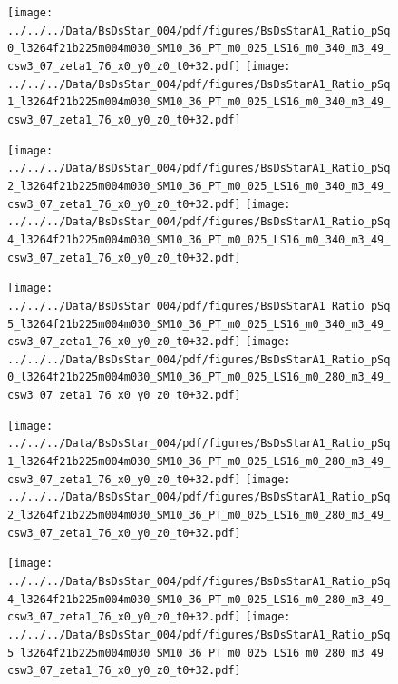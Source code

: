 \documentclass[a4paper,10pt]{article}
\begin{document}
\begin{figure}[p]
 \texttt{[image: ../../../Data/BsDsStar\_004/pdf/figures/BsDsStarA1\_Ratio\_pSq0\_l3264f21b225m004m030\_SM10\_36\_PT\_m0\_025\_LS16\_m0\_340\_m3\_49\_csw3\_07\_zeta1\_76\_x0\_y0\_z0\_t0+32.pdf]} 
 \texttt{[image: ../../../Data/BsDsStar\_004/pdf/figures/BsDsStarA1\_Ratio\_pSq1\_l3264f21b225m004m030\_SM10\_36\_PT\_m0\_025\_LS16\_m0\_340\_m3\_49\_csw3\_07\_zeta1\_76\_x0\_y0\_z0\_t0+32.pdf]} 
 \end{figure}
\begin{figure}[p]
 \texttt{[image: ../../../Data/BsDsStar\_004/pdf/figures/BsDsStarA1\_Ratio\_pSq2\_l3264f21b225m004m030\_SM10\_36\_PT\_m0\_025\_LS16\_m0\_340\_m3\_49\_csw3\_07\_zeta1\_76\_x0\_y0\_z0\_t0+32.pdf]} 
 \texttt{[image: ../../../Data/BsDsStar\_004/pdf/figures/BsDsStarA1\_Ratio\_pSq4\_l3264f21b225m004m030\_SM10\_36\_PT\_m0\_025\_LS16\_m0\_340\_m3\_49\_csw3\_07\_zeta1\_76\_x0\_y0\_z0\_t0+32.pdf]} 
 \end{figure}
\begin{figure}[p]
 \texttt{[image: ../../../Data/BsDsStar\_004/pdf/figures/BsDsStarA1\_Ratio\_pSq5\_l3264f21b225m004m030\_SM10\_36\_PT\_m0\_025\_LS16\_m0\_340\_m3\_49\_csw3\_07\_zeta1\_76\_x0\_y0\_z0\_t0+32.pdf]} 
 \texttt{[image: ../../../Data/BsDsStar\_004/pdf/figures/BsDsStarA1\_Ratio\_pSq0\_l3264f21b225m004m030\_SM10\_36\_PT\_m0\_025\_LS16\_m0\_280\_m3\_49\_csw3\_07\_zeta1\_76\_x0\_y0\_z0\_t0+32.pdf]} 
 \end{figure}
\clearpage
\begin{figure}[p]
 \texttt{[image: ../../../Data/BsDsStar\_004/pdf/figures/BsDsStarA1\_Ratio\_pSq1\_l3264f21b225m004m030\_SM10\_36\_PT\_m0\_025\_LS16\_m0\_280\_m3\_49\_csw3\_07\_zeta1\_76\_x0\_y0\_z0\_t0+32.pdf]} 
 \texttt{[image: ../../../Data/BsDsStar\_004/pdf/figures/BsDsStarA1\_Ratio\_pSq2\_l3264f21b225m004m030\_SM10\_36\_PT\_m0\_025\_LS16\_m0\_280\_m3\_49\_csw3\_07\_zeta1\_76\_x0\_y0\_z0\_t0+32.pdf]} 
 \end{figure}
\begin{figure}[p]
 \texttt{[image: ../../../Data/BsDsStar\_004/pdf/figures/BsDsStarA1\_Ratio\_pSq4\_l3264f21b225m004m030\_SM10\_36\_PT\_m0\_025\_LS16\_m0\_280\_m3\_49\_csw3\_07\_zeta1\_76\_x0\_y0\_z0\_t0+32.pdf]} 
 \texttt{[image: ../../../Data/BsDsStar\_004/pdf/figures/BsDsStarA1\_Ratio\_pSq5\_l3264f21b225m004m030\_SM10\_36\_PT\_m0\_025\_LS16\_m0\_280\_m3\_49\_csw3\_07\_zeta1\_76\_x0\_y0\_z0\_t0+32.pdf]} 
 \end{figure}
\clearpage
\end{document}
